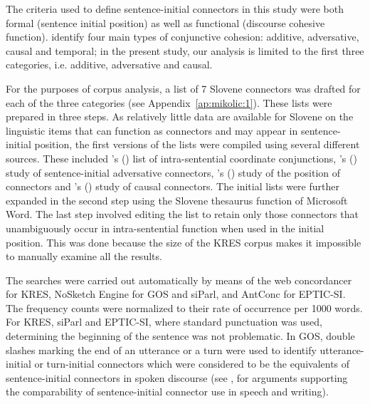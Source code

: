 \documentclass[output=paper]{langscibook}
\begin{document}
The criteria used to define sentence-initial connectors in this study were both formal
(sentence initial position) as well as functional (discourse cohesive function). \citet{HallidayHasan1976} identify four main types of conjunctive cohesion: additive, adversative, causal and temporal; in the present study, our analysis is limited to the first three categories, i.e. additive, adversative and causal. 

For the purposes of corpus analysis, a list of 7 Slovene connectors was drafted for each of the three categories (see Appendix~\ref{ap:mikolic:1}). These lists were prepared in three steps. As relatively little data are available for Slovene on the linguistic items that can function as connectors and may appear in sentence-initial position, the first versions of the lists were compiled using several different sources. These included \citeauthor{Toporisic2004}'s (\citeyear[646--652]{Toporisic2004}) list of intra-sentential coordinate conjunctions, \citeauthor{PisanskiPeterlin2015}'s (\citeyear{PisanskiPeterlin2015}) study of sentence-initial adversative connectors, \citeauthor{BulcGorjanc2015}'s (\citeyear{BulcGorjanc2015}) study of the position of connectors and \citeauthor{HirciMikolic2014}'s (\citeyear{HirciMikolic2014}) study of causal connectors. The initial lists were further expanded in the second step using the Slovene thesaurus function of Microsoft Word. The last step involved editing the list to retain only those connectors that unambiguously occur in intra-sentential function when used in the initial position. This was done because the size of the KRES corpus makes it impossible to manually examine all the results.

The searches were carried out automatically by means of the web concordancer for KRES, NoSketch Engine for GOS and siParl, and AntConc \citep{Anthony2020} for EPTIC-SI. The frequency counts were normalized to their rate of occurrence per 1000 words. For KRES, siParl and EPTIC-SI, where standard punctuation was used, determining the beginning of the sentence was not problematic. In GOS, double slashes marking the end of an utterance or a turn were used to identify utterance-initial or turn-initial connectors which were considered to be the equivalents of sentence-initial connectors in spoken discourse (see \citealt{Dorgeloh2004}, for arguments supporting the comparability of sentence-initial connector use in speech and writing).
\end{document}
